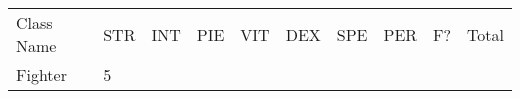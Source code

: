 \documentclass[12pt]{article}
\begin{document}
\begin{longtable}[]{@{}llllllllll@{}}
\toprule
\begin{minipage}[t]{0.13\columnwidth}\raggedright\strut
Class Name
\strut\end{minipage} &
\begin{minipage}[t]{0.06\columnwidth}\raggedright\strut
STR
\strut\end{minipage} &
\begin{minipage}[t]{0.06\columnwidth}\raggedright\strut
INT
\strut\end{minipage} &
\begin{minipage}[t]{0.06\columnwidth}\raggedright\strut
PIE
\strut\end{minipage} &
\begin{minipage}[t]{0.06\columnwidth}\raggedright\strut
VIT
\strut\end{minipage} &
\begin{minipage}[t]{0.06\columnwidth}\raggedright\strut
DEX
\strut\end{minipage} &
\begin{minipage}[t]{0.06\columnwidth}\raggedright\strut
SPE
\strut\end{minipage} &
\begin{minipage}[t]{0.06\columnwidth}\raggedright\strut
PER
\strut\end{minipage} &
\begin{minipage}[t]{0.07\columnwidth}\raggedright\strut
F?
\strut\end{minipage} &
\begin{minipage}[t]{0.08\columnwidth}\raggedright\strut
Total
\strut\end{minipage}\tabularnewline
\begin{minipage}[t]{0.13\columnwidth}\raggedright\strut
Fighter
\strut\end{minipage} &
\begin{minipage}[t]{0.06\columnwidth}\raggedright\strut
5
\strut\end{minipage} &
\begin{minipage}[t]{0.06\columnwidth}\raggedright\strut
\strut\end{minipage} &
\begin{minipage}[t]{0.06\columnwidth}\raggedright\strut
\strut\end{minipage} &
\begin{minipage}[t]{0.06\columnwidth}\raggedright\strut
\strut\end{minipage} &
\begin{minipage}[t]{0.06\columnwidth}\raggedright\strut

\end{minipage}
\end{longtable}
\end{document}
